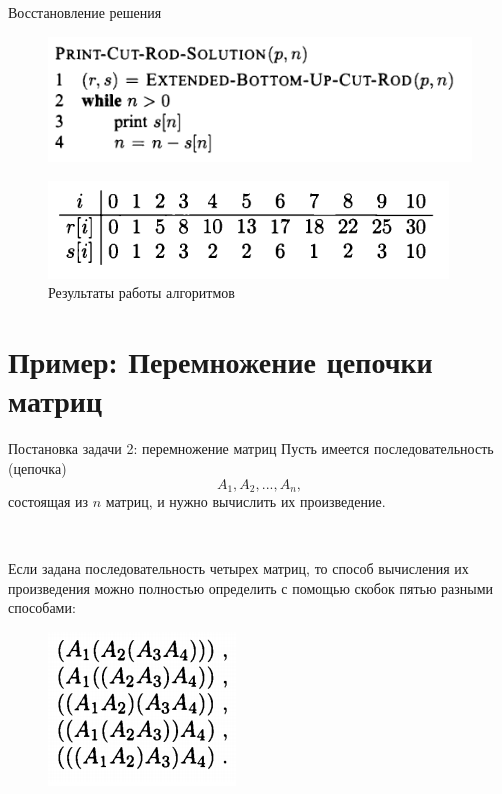 \documentclass{beamer}
\begin{document}
\begin{frame}[t]{Восстановление решения}
   \begin{figure}[h]
		\centering
		\includegraphics[scale=0.7]{images/lec09-pic10.png}
	\end{figure}
	
   \begin{figure}[h]
		\centering
		\includegraphics[scale=0.7]{images/lec09-pic11.png}
		\caption{Результаты работы алгоритмов}
	\end{figure}	
\end{frame}

\section{Пример: Перемножение цепочки матриц}

\begin{frame}[t]{Постановка задачи 2: перемножение матриц}
    Пусть имеется последовательность (цепочка) 
    \[
    A_1, A_2,...,A_n, 
    \]
    состоящая из $n$ матриц, и нужно вычислить их произведение.
    
    ~
    
    Если задана последовательность четырех матриц, то способ вычисления их произведения можно полностью определить с помощью скобок пятью разными способами:
   \begin{figure}[h]
		\centering
		\includegraphics[scale=0.6]{images/lec09-pic12.png}
	\end{figure}
\end{frame}
\end{document}
